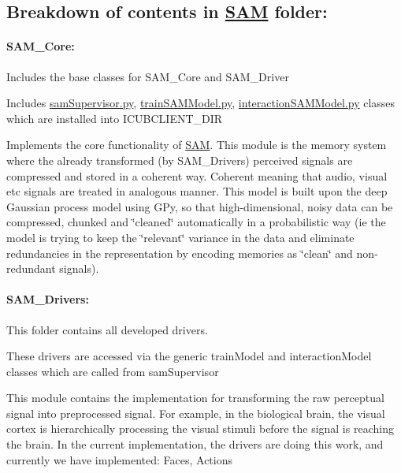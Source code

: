 \subsection*{Breakdown of contents in \hyperlink{namespaceSAM}{S\+AM} folder\+:}

\paragraph*{S\+A\+M\+\_\+\+Core\+:}


\begin{DoxyItemize}
\item Includes the base classes for S\+A\+M\+\_\+\+Core and S\+A\+M\+\_\+\+Driver
\item Includes \hyperlink{samSupervisor_8py}{sam\+Supervisor.\+py}, \hyperlink{trainSAMModel_8py}{train\+S\+A\+M\+Model.\+py}, \hyperlink{interactionSAMModel_8py}{interaction\+S\+A\+M\+Model.\+py} classes which are installed into I\+C\+U\+B\+C\+L\+I\+E\+N\+T\+\_\+\+D\+IR
\item Implements the core functionality of \hyperlink{namespaceSAM}{S\+AM}. This module is the memory system where the already transformed (by S\+A\+M\+\_\+\+Drivers) perceived signals are compressed and stored in a coherent way. Coherent meaning that audio, visual etc signals are treated in analogous manner. This model is built upon the deep Gaussian process model using G\+Py, so that high-\/dimensional, noisy data can be compressed, chunked and \char`\"{}cleaned\char`\"{} automatically in a probabilistic way (ie the model is trying to keep the \char`\"{}relevant\char`\"{} variance in the data and eliminate redundancies in the representation by encoding memories as \char`\"{}clean\char`\"{} and non-\/redundant signals).
\end{DoxyItemize}

\paragraph*{S\+A\+M\+\_\+\+Drivers\+:}


\begin{DoxyItemize}
\item This folder contains all developed drivers.
\item These drivers are accessed via the generic train\+Model and interaction\+Model classes which are called from sam\+Supervisor
\item This module contains the implementation for transforming the raw perceptual signal into preprocessed signal. For example, in the biological brain, the visual cortex is hierarchically processing the visual stimuli before the signal is reaching the brain. In the current implementation, the drivers are doing this work, and currently we have implemented\+: Faces, Actions
\end{DoxyItemize}

